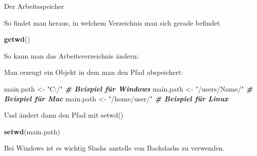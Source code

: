 \documentclass[
  ignorenonframetext,
]{beamer}
\newenvironment{Shaded}{\begin{snugshade}}{\end{snugshade}}
\newcommand{\CommentTok}[1]{\textcolor[rgb]{0.00,0.40,1.00}{\textbf{\textit{#1}}}}
\newcommand{\KeywordTok}[1]{\textcolor[rgb]{0.26,0.66,0.93}{\textbf{#1}}}
\newcommand{\NormalTok}[1]{\textcolor[rgb]{0.74,0.68,0.62}{#1}}
\newcommand{\StringTok}[1]{\textcolor[rgb]{0.02,0.61,0.04}{#1}}
\begin{document}
\begin{frame}[fragile]{Der Arbeitsspeicher}
\protect\hypertarget{der-arbeitsspeicher}{}

So findet man heraus, in welchem Verzeichnis man sich gerade befindet

\begin{Shaded}
\begin{Highlighting}[]
\KeywordTok{getwd}\NormalTok{()}
\end{Highlighting}
\end{Shaded}

So kann man das Arbeitsverzeichnis ändern:

Man erzeugt ein Objekt in dem man den Pfad abspeichert:

\begin{Shaded}
\begin{Highlighting}[]
\NormalTok{main.path <-}\StringTok{ "C:/"} \CommentTok{# Beispiel für Windows}
\NormalTok{main.path <-}\StringTok{ "/users/Name/"} \CommentTok{# Beispiel für Mac}
\NormalTok{main.path <-}\StringTok{ "/home/user/"} \CommentTok{# Beispiel für Linux}
\end{Highlighting}
\end{Shaded}

Und ändert dann den Pfad mit setwd()

\begin{Shaded}
\begin{Highlighting}[]
\KeywordTok{setwd}\NormalTok{(main.path)}
\end{Highlighting}
\end{Shaded}

Bei Windows ist es wichtig Slashs anstelle von Backslashs zu verwenden.

\end{frame}
\end{document}
